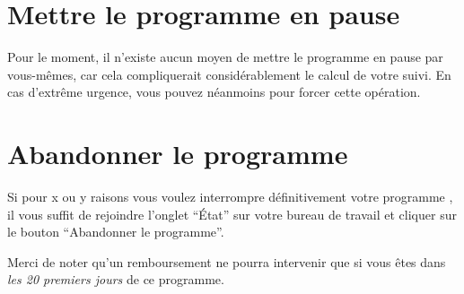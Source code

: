 % 
% 
% 
% 
% 
% 
% 
% 

\section{Mettre le programme en pause}\hypertarget{programme-en-pause}{}\label{programme-en-pause}

Pour le moment, il n'existe aucun moyen de mettre le programme en pause par vous-mêmes, car cela compliquerait considérablement le calcul de votre suivi. En cas d'extrême urgence, vous pouvez néanmoins  pour forcer cette opération.

\section{Abandonner le programme}\hypertarget{abandonner-le-programme}{}\label{abandonner-le-programme}

Si pour x ou y raisons vous voulez interrompre définitivement votre programme \unan{}, il vous suffit de rejoindre l'onglet ``État'' sur votre bureau de travail et cliquer sur le bouton ``Abandonner le programme''.

Merci de noter qu'un remboursement ne pourra intervenir que si vous êtes dans \emph{les 20 premiers jours} de ce programme.


